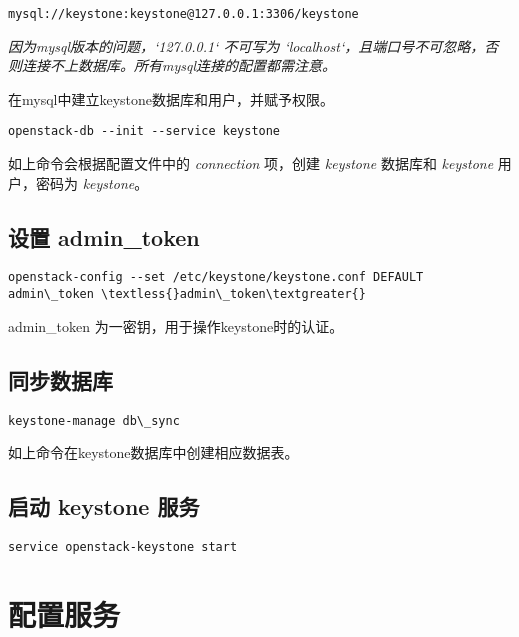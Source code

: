 \documentclass[letterpaper,10pt,english]{sphinxmanual}
\begin{document}
\begin{Verbatim}[commandchars=\\\{\}]
mysql://keystone:keystone@127.0.0.1:3306/keystone
\end{Verbatim}

\emph{因为mysql版本的问题，{}`127.0.0.1{}` 不可写为 {}`localhost{}`，且端口号不可忽略，否则连接不上数据库。所有mysql连接的配置都需注意。}

在mysql中建立keystone数据库和用户，并赋予权限。

\begin{Verbatim}[commandchars=\\\{\}]
openstack-db --init --service keystone
\end{Verbatim}

如上命令会根据配置文件中的 \emph{connection} 项，创建 \emph{keystone} 数据库和 \emph{keystone} 用户，密码为 \emph{keystone}。


\subsection{设置 admin\_token}
\label{keystone:admin-token}
\begin{Verbatim}[commandchars=\\\{\}]
openstack-config --set /etc/keystone/keystone.conf DEFAULT admin\_token \textless{}admin\_token\textgreater{}
\end{Verbatim}

admin\_token 为一密钥，用于操作keystone时的认证。


\subsection{同步数据库}
\label{keystone:id3}
\begin{Verbatim}[commandchars=\\\{\}]
keystone-manage db\_sync
\end{Verbatim}

如上命令在keystone数据库中创建相应数据表。


\subsection{启动 keystone 服务}
\label{keystone:id4}
\begin{Verbatim}[commandchars=\\\{\}]
service openstack-keystone start
\end{Verbatim}


\section{配置服务}
\label{keystone:id5}
\end{document}
